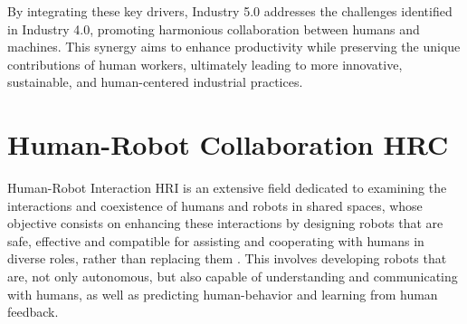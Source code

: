 By integrating these key drivers, Industry 5.0 addresses the challenges identified in Industry 4.0, promoting harmonious collaboration between humans and machines. This synergy aims to enhance productivity while preserving the unique contributions of human workers, ultimately leading to more innovative, sustainable, and human-centered industrial practices.





\section{Human-Robot Collaboration \ac{HRC}}
\label{subsection:human-robot-collab}
% 

Human-Robot Interaction \ac{HRI} is an extensive field dedicated to examining the interactions and coexistence of humans and robots in shared spaces, whose objective consists on enhancing these interactions by designing robots that are safe, effective and compatible for assisting and cooperating with humans in diverse roles, rather than replacing them \cite{Ogenyi2021}.
This involves developing robots that are, not only autonomous, but also capable of understanding and communicating with humans, as well as predicting
human-behavior and learning from human feedback. 

